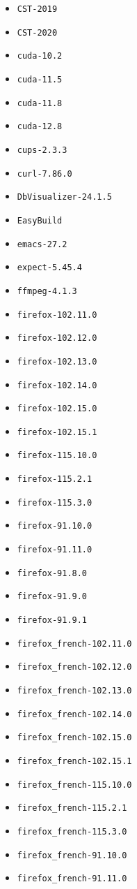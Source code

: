 \begin{multicols}{3}
\begin{itemize}
\item \verb|CST-2019|
\item \verb|CST-2020|
\item \verb|cuda-10.2|
\item \verb|cuda-11.5|
\item \verb|cuda-11.8|
\item \verb|cuda-12.8|
\item \verb|cups-2.3.3|
\item \verb|curl-7.86.0|
\item \verb|DbVisualizer-24.1.5|
\item \verb|EasyBuild|
\item \verb|emacs-27.2|
\item \verb|expect-5.45.4|
\item \verb|ffmpeg-4.1.3|
\item \verb|firefox-102.11.0|
\item \verb|firefox-102.12.0|
\item \verb|firefox-102.13.0|
\item \verb|firefox-102.14.0|
\item \verb|firefox-102.15.0|
\item \verb|firefox-102.15.1|
\item \verb|firefox-115.10.0|
\item \verb|firefox-115.2.1|
\item \verb|firefox-115.3.0|
\item \verb|firefox-91.10.0|
\item \verb|firefox-91.11.0|
\item \verb|firefox-91.8.0|
\item \verb|firefox-91.9.0|
\item \verb|firefox-91.9.1|
\item \verb|firefox_french-102.11.0|
\item \verb|firefox_french-102.12.0|
\item \verb|firefox_french-102.13.0|
\item \verb|firefox_french-102.14.0|
\item \verb|firefox_french-102.15.0|
\item \verb|firefox_french-102.15.1|
\item \verb|firefox_french-115.10.0|
\item \verb|firefox_french-115.2.1|
\item \verb|firefox_french-115.3.0|
\item \verb|firefox_french-91.10.0|
\item \verb|firefox_french-91.11.0|

\end{itemize}
\end{multicols}
